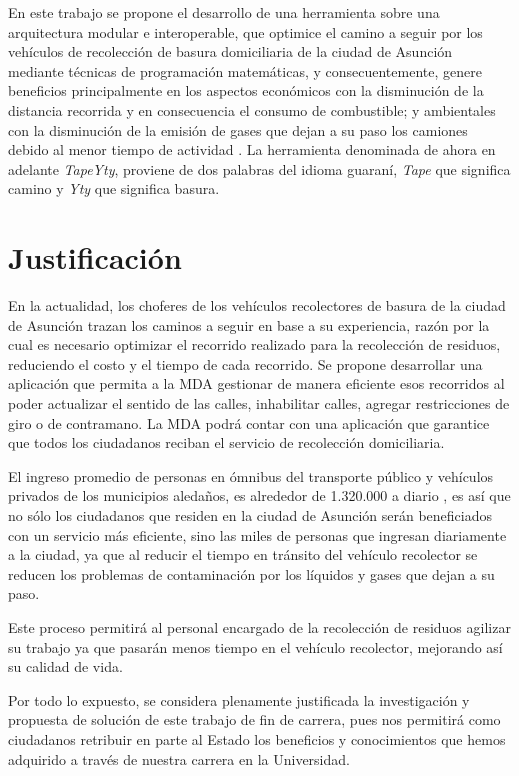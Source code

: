 En este trabajo se propone el desarrollo de una herramienta sobre una arquitectura modular e interoperable, que optimice el camino a seguir por los vehículos de recolección de basura domiciliaria de la ciudad de Asunción mediante técnicas de programación matemáticas, y consecuentemente, genere beneficios principalmente en los aspectos económicos con la disminución de la distancia recorrida y en consecuencia el consumo de combustible; y ambientales con la disminución de la emisión de gases que dejan a su paso los camiones debido al menor tiempo de actividad \citep{Vu2018ParameterModel}. La herramienta denominada de ahora en adelante \textit{TapeYty}, proviene de dos palabras del idioma guaraní, \textit{Tape} que significa camino y \textit{Yty} que significa basura.

\section{Justificación}
 En la actualidad, los choferes de los vehículos recolectores de basura de la ciudad de Asunción trazan los caminos a seguir en base a su experiencia, razón por la cual es necesario optimizar el recorrido realizado para la recolección de residuos, reduciendo el costo y el tiempo de cada recorrido. Se propone desarrollar una aplicación que permita a la MDA gestionar de manera eficiente esos recorridos al poder actualizar el sentido de las calles, inhabilitar calles, agregar restricciones de giro o de contramano. La MDA podrá contar con una aplicación que garantice que todos los ciudadanos reciban el servicio de recolección domiciliaria.

El ingreso promedio de personas en ómnibus del transporte público y vehículos privados de los municipios aledaños, es alrededor de 1.320.000 a diario \citep{DiarioABCColor2016PorColor}, es así que no sólo los ciudadanos que residen en la ciudad de Asunción serán beneficiados con un servicio más eficiente, sino las miles de personas que ingresan diariamente a la ciudad, ya que al reducir el tiempo en tránsito del vehículo recolector se reducen los problemas de contaminación por los líquidos y gases que dejan a su paso.

Este proceso permitirá al personal encargado de la recolección de residuos agilizar su trabajo ya que pasarán menos tiempo en el vehículo recolector, mejorando así su calidad de vida.
 
Por todo lo expuesto, se considera plenamente justificada la investigación y propuesta de solución de este trabajo de fin de carrera, pues nos permitirá como ciudadanos retribuir en parte al Estado los beneficios y conocimientos que hemos adquirido a través de nuestra carrera en la Universidad.

